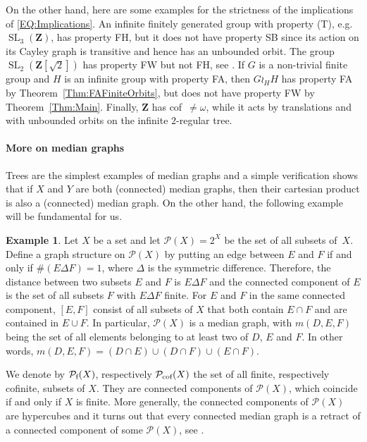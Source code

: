 \documentclass[a4paper]{article}
\newcounter{mycomment}
\newcommand{\mycomment}[2][]{\refstepcounter{mycomment}{\todo[color={green!33},size=\small]{\textbf{Commentaire [\uppercase{#1}\themycomment]:}~#2}}}
\newcommand{\PH}[1]{\todo[color={blue!33},size=small]{#1}}
\theoremstyle{definition}
\newtheorem{exmp}[lem]{Example}
\DeclareMathOperator\SL{SL}
\DeclarePairedDelimiter\gen{\langle}{\rangle}
\newcommand*{\field}[1]{\mathbf{#1}}
\newcommand*{\Z}{\field{Z}}
\newcommand*{\powerset}[1]{\mathcal P(#1)}
\newcommand*{\powersetf}[1]{\mathcal P_{\textnormal{f}}(#1)}
\newcommand*{\powersetcof}[1]{\mathcal P_{\textnormal{cof}}(#1)}
\begin{document}
On the other hand, here are some examples for the strictness of the implications of \eqref{EQ:Implications}.
An infinite finitely generated group with property (T), e.g. $\SL_3(\Z)$, has property FH, but it does not have property SB since its action on its Cayley graph is transitive and hence has an unbounded orbit.
The group $\SL_2(\Z[\sqrt{2}])$ has property FW but not FH, see \cite{MR3299841}.
If $G$ is a non-trivial finite group and $H$ is an infinite group with property FA, then $G\wr_HH$ has property FA by Theorem~\ref{Thm:FAFiniteOrbits}, but does not have property FW by Theorem~\ref{Thm:Main}.
Finally, $\Z$ has cof~$\neq\omega$, %
 while it acts by translations and with unbounded orbits on the infinite $2$-regular tree.
\paragraph{More on median graphs}
Trees are the simplest examples of median graphs and a simple verification shows that if $X$ and $Y$ are both (connected) median graphs, then their cartesian product is also a (connected) median graph.
On the other hand, the following example will be fundamental for us.
%
%
\begin{exmp}\label{Ex:MainMedian}
Let $X$ be a set and let  $\powerset{X}=2^X$ be the set of all subsets of~$X$.
Define a graph structure on $\powerset{X}$ by putting an edge between $E$ and $F$ if and only if $\#(E\Delta F)=1$, where $\Delta$ is the symmetric difference.
Therefore, the distance between two subsets $E$ and $F$ is $E\Delta F$ and
the connected component of $E$ is the set of all subsets $F$ with $E\Delta F$ finite.
For $E$ and $F$ in the same connected component, $[E,F]$ consist of all subsets of $X$ that both contain $E\cap F$ and are contained in $E\cup F$.
In particular, $\powerset{X}$ is a median graph, with $m(D,E,F)$ being the set of all elements belonging to at least two of $D$, $E$ and $F$. In other words, $m(D,E,F)=(D\cap E)\cup(D\cap F)\cup(E\cap F)$.
\end{exmp}
%
%
We denote by $\powersetf{X}$, respectively $\powersetcof{X}$ the set of all finite, respectively cofinite, subsets of $X$.
They are connected components of $\powerset{X}$, which coincide if and only if $X$ is finite.
More generally, the connected components of $\powerset{X}$ are hypercubes and it turns out that every connected median graph is a retract of a connected component of some $\powerset{X}$, see \cite{Bandelt1984}.
\end{document}

